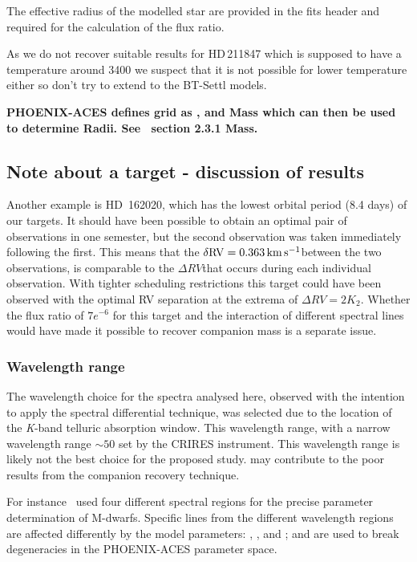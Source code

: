 The effective radius of the modelled star are provided in the fits header and required for the calculation of the flux ratio.


As we do not recover suitable results for HD\,211847 which is supposed to have a temperature around 3400\K{} we suspect that it is not possible for lower temperature either so don't try to extend to the {BT-Settl} models.


\textbf{
    {PHOENIX-ACES} defines grid as \Teff{}, \logg{} and Mass which can then be used to determine Radii.
    See~\citep{husser_new_2013} section 2.3.1 Mass.}




\subsection{Note about a target - discussion of results}
Another example is {HD~162020}, which has the lowest orbital period (8.4 days) of our targets.
It should have been possible to obtain an optimal pair of observations in one semester, but the second observation was taken immediately following the first.
This means that the \(\rm \delta {RV} = 0.363\,\si{\kilo\metre\per\second}{}\)between the two observations, is comparable to the \(\Delta {RV}\)that occurs during each individual observation.
With tighter scheduling restrictions this target could have been observed with the optimal {RV} separation at the extrema of \(\Delta {RV}=2 K_{2}\).
Whether the flux ratio of \(7e^{-6}\) for this target and the interaction of different spectral lines would have made it possible to recover companion mass is a separate issue.


\subsubsection{Wavelength range}
The wavelength choice for the spectra analysed here, observed with the intention to apply the spectral differential technique, was selected due to the location of the \emph{K}-band telluric absorption window.
This wavelength range, with a narrow wavelength range \(\sim50\)\nm{} set by the {CRIRES} instrument.
This wavelength range is likely not the best choice for the proposed study.
 may contribute to the poor results from the companion recovery technique.

For instance~\citet{passegger_fundamental_2016} used four different spectral regions for the precise parameter determination of M-dwarfs.
Specific lines from the different wavelength regions are affected differently by the model parameters: \Teff{}, \logg{}, and \feh{}; and are used to break degeneracies in the {PHOENIX-ACES} parameter space.


